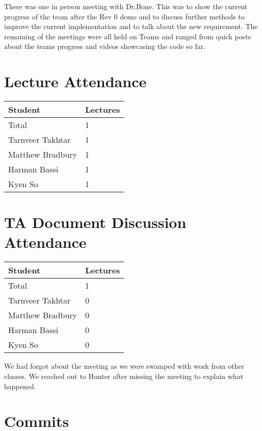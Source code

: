 \documentclass{article}
\begin{document}
There was one in person meeting with Dr.Bone. 
This was to show the current progress of the team after the Rev 0 demo and to discuss 
further methods to improve the current implementation and to talk about the new requirement.
The remaining of the meetings were all held on Teams and ranged from quick posts about the teams 
progress and videos showcasing the code so far.
    

\section{Lecture Attendance}

\begin{table}[H]
    \centering
    \begin{tabular}{ll}
    \toprule
    \textbf{Student} & \textbf{Lectures}\\
    \midrule
    Total & 1\\
    Tarnveer Takhtar & 1\\
    Matthew Bradbury & 1\\
    Harman Bassi & 1\\
    Kyen So & 1\\
    \bottomrule
    \end{tabular}
    \end{table}


\section{TA Document Discussion Attendance}

\begin{table}[H]
    \centering
    \begin{tabular}{ll}
    \toprule
    \textbf{Student} & \textbf{Lectures}\\
    \midrule
    Total & 1\\
    Tarnveer Takhtar & 0\\
    Matthew Bradbury & 0\\
    Harman Bassi & 0\\
    Kyen So & 0\\
    \bottomrule
    \end{tabular}
    \end{table}

We had forgot about the meeting as we were swamped with work from other classes. 
We reached out to Hunter after missing the meeting to explain what happened. 

\section{Commits}
\end{document}
